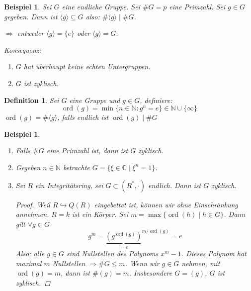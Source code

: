 \documentclass[a4paper,12pt,numbers=noenddot,parskip=full]{scrartcl}
\newcommand{\setN}{\mathbb{N}}
\newcommand{\setC}{\mathbb{C}}
\theoremstyle{dotless}
\newtheorem{definition}[theorem]{Definition}
\newtheorem{example}[theorem]{Beispiel}
\theoremstyle{remark}
\begin{document}
	\begin{example}
		Sei $G$ eine endliche Gruppe. Sei $\#G = p$ eine Primzahl. Sei $g \in G$ gegeben. Dann ist $\langle g \rangle \subseteq G$ also: $\#\langle g \rangle \mid \#G$.
		
		$\Rightarrow$ entweder $\langle g \rangle = \{ e \}$ oder $\langle g \rangle = G$.
		
		Konsequenz:
		\begin{enumerate}
			\item $G$ hat überhaupt keine echten Untergruppen.
			\item $G$ ist zyklisch.
		\end{enumerate}
	\end{example}

	\begin{definition}
		Sei $G$ eine Gruppe und $g \in G$, definiere:
		\begin{equation*}
			\operatorname{ord}(g) = \min \{ n \in \setN : g^n = e \} \in \setN \cup \{ \infty \}
		\end{equation*}
		$\operatorname{ord}(g) = \# \langle g \rangle$, falls endlich ist $\operatorname{ord}(g) \mid \#G$
	\end{definition}

	\begin{example}
		\begin{enumerate}
			\item Falls $\#G$ eine Primzahl ist, dann ist $G$ zyklisch.
			\item Gegeben $n \in \setN$ betrachte $G = \{ \xi \in \setC \mid \xi^n = 1 \}$.
			\item Sei $R$ ein Integritätsring, sei $G \subset (R^*, \cdot)$ endlich. Dann ist $G$ zyklisch.
			\begin{proof}
				Weil $R \hookrightarrow Q(R)$ eingebettet ist, können wir ohne Einschränkung annehmen. $R = k$ ist ein Körper. Sei $m = \max \{ \operatorname{ord}(h) \mid h \in G \}$. Dann gilt $\forall g \in G$
				\begin{equation*}
					g^m = {\underbrace{\left( g^{\operatorname{ord}(g)} \right)}_{=e}}^{m/\operatorname{ord}(g)} = e
				\end{equation*}
				Also: alle $g \in G$ sind Nullstellen des Polynoms $x^m - 1$. Dieses Polynom hat maximal $m$ Nullstellen $\Rightarrow \#G \leq m$. Wenn wir $g \in G$ nehmen, mit $\operatorname{ord}(g) = m$, dann ist $\#(g) = m$. Insbesondere $G = (g)$, $G$ ist zyklisch.
			\end{proof}
		\end{enumerate}
	\end{example}
\end{document}
